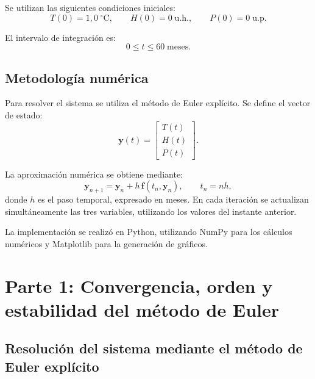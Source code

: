 Se utilizan las siguientes condiciones iniciales:
\begin{equation}
    T(0)=1{,}0\;{}^{\circ}\mathrm{C},
    \qquad
    H(0)=0\;\mathrm{u.h.},
    \qquad
    P(0)=0\;\mathrm{u.p.}
\end{equation}

El intervalo de integración es:
\begin{equation}
    0\leq t\leq 60\;\mathrm{meses}.
\end{equation}

\subsection{Metodología numérica}

Para resolver el sistema se utiliza el método de Euler explícito.
Se define el vector de estado:
\begin{equation}
    \mathbf{y}(t)=
    \begin{bmatrix}
        T(t)\\
        H(t)\\
        P(t)
    \end{bmatrix}.
\end{equation}

La aproximación numérica se obtiene mediante:
\begin{equation}
    \mathbf{y}_{n+1}
    =
    \mathbf{y}_n+h\,\mathbf{f}(t_n,\mathbf{y}_n),
    \qquad
    t_n=nh,
\end{equation}
donde $h$ es el paso temporal, expresado en meses.
En cada iteración se actualizan simultáneamente las tres variables,
utilizando los valores del instante anterior.

\par La implementación se realizó en Python, utilizando NumPy para los cálculos numéricos y Matplotlib para la generación de gráficos.

\newpage

\section{Parte 1: Convergencia, orden y estabilidad del método de Euler}

\subsection{Resolución del sistema mediante el método de Euler explícito}

